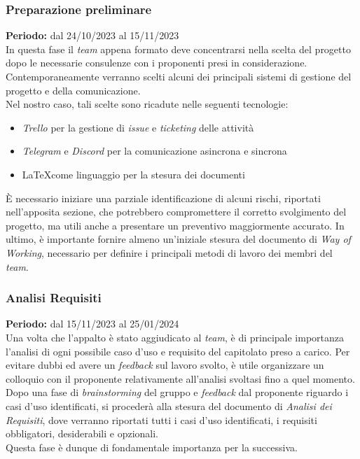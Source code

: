 \documentclass[5pt]{article}
\begin{document}
\subsubsection{Preparazione preliminare}
\textbf{Periodo:} dal 24/10/2023 al 15/11/2023 
\vspace{0.3cm} \\
In questa fase il \textit{team} appena formato deve concentrarsi nella scelta del progetto dopo le necessarie consulenze con i proponenti presi in considerazione. \\
Contemporaneamente verranno scelti alcuni dei principali sistemi di gestione del progetto e della comunicazione. \\
Nel nostro caso, tali scelte sono ricadute nelle seguenti tecnologie: 
\begin{itemize}
  \item \textit{Trello} per la gestione di \textit{issue} e \textit{ticketing} delle attività
  \item \textit{Telegram} e \textit{Discord} per la comunicazione asincrona e sincrona
  \item \LaTeX come linguaggio per la stesura dei documenti
\end{itemize}
È necessario iniziare una parziale identificazione di alcuni rischi, riportati nell'apposita sezione, che potrebbero compromettere il corretto svolgimento del progetto, 
ma utili anche a presentare un preventivo maggiormente accurato. 
In ultimo, è importante fornire almeno un'iniziale stesura del documento di \textit{Way of Working}, necessario per definire i principali metodi di lavoro dei membri del \textit{team}.
\subsubsection{Analisi Requisiti}
\textbf{Periodo:} dal 15/11/2023 al 25/01/2024 
\vspace{0.3cm} \\
Una volta che l'appalto è stato aggiudicato al \textit{team}, è di principale importanza l'analisi di ogni possibile caso d'uso e requisito del capitolato preso a carico.
Per evitare dubbi ed avere un \textit{feedback} sul lavoro svolto, è utile organizzare un colloquio con il proponente relativamente all'analisi svoltasi fino a quel momento. \\
Dopo una fase di \textit{brainstorming} del gruppo e \textit{feedback} dal proponente riguardo i casi d'uso identificati, si procederà alla stesura del documento di \textit{Analisi dei Requisiti},
dove verranno riportati tutti i casi d'uso identificati, i requisiti obbligatori, desiderabili e opzionali. \\
Questa fase è dunque di fondamentale importanza per la successiva.
\end{document}
